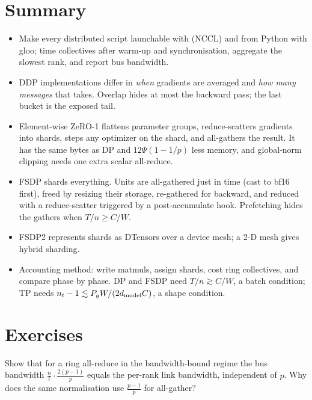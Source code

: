 \section{Summary}\label{sec:sharding:summary}

\begin{itemize}
  \item Make every distributed script launchable with  (NCCL) and from Python with
    gloo; time collectives after warm-up and synchronisation, aggregate the slowest rank, and report
    bus bandwidth.
  \item DDP implementations differ in \emph{when} gradients are averaged and \emph{how many
    messages} that takes. Overlap hides at most the backward pass; the last bucket is the exposed
    tail.
  \item Element-wise ZeRO-1 flattens parameter groups, reduce-scatters gradients into shards,
    steps any optimizer on the shard, and all-gathers the result. It has the same bytes as DP and $12\Psi(1-1/p)$
    less memory, and global-norm clipping needs one extra scalar all-reduce.
  \item FSDP shards everything. Units are all-gathered just in time (cast to bf16 first), freed by
    resizing their storage, re-gathered for backward, and reduced with a reduce-scatter triggered by a
    post-accumulate hook. Prefetching hides the gathers when $T/n \ge C/W$.
  \item FSDP2 represents shards as DTensors over a device mesh; a 2-D mesh gives hybrid sharding.
  \item Accounting method: write matmuls, assign shards, cost ring collectives, and compare phase
    by phase. DP and FSDP need $T/n \gtrsim C/W$, a batch condition; TP needs
    $n_t - 1\lesssim P_g W/(2d_{\text{model}} C)$, a shape condition.
\end{itemize}

\section{Exercises}\label{sec:sharding:exercises}

\begin{exercise}
Show that for a ring all-reduce in the bandwidth-bound regime the bus bandwidth
$\frac{n}{t}\cdot\frac{2(p-1)}{p}$ equals the per-rank link bandwidth, independent of $p$.
Why does the same normalisation use $\frac{p-1}{p}$ for all-gather?
\end{exercise}

